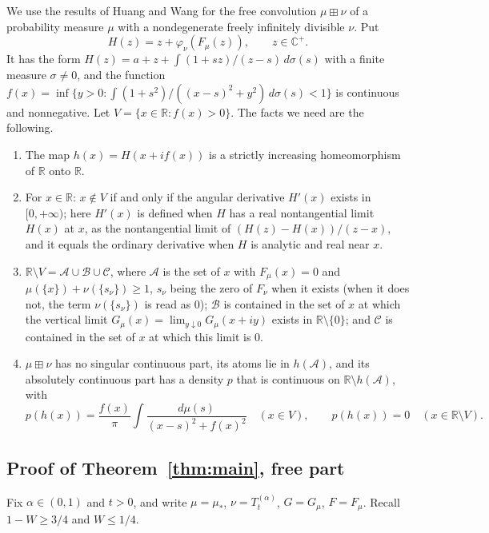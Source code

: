 \documentclass[11pt]{amsart}
\theoremstyle{definition}
\theoremstyle{remark}
\numberwithin{equation}{section}
\newcommand{\R}{\mathbb R}
\newcommand{\C}{\mathbb C}
\newcommand{\bp}{\boxplus}
\begin{document}
We use the results of Huang and Wang \cite[Section 3]{HW} for the free convolution $\mu\bp\nu$ of a probability measure $\mu$ with a nondegenerate freely infinitely divisible $\nu$. Put
\begin{equation}\label{eq:H}
H(z)=z+\varphi_\nu(F_\mu(z)),\qquad z\in\C^+ .
\end{equation}
It has the form $H(z)=a+z+\int(1+sz)/(z-s)\,d\sigma(s)$ with a finite measure $\sigma\ne0$, and the function $f(x)=\inf\{y>0:\int(1+s^2)/((x-s)^2+y^2)\,d\sigma(s)<1\}$ is continuous and nonnegative. Let $V=\{x\in\R:f(x)>0\}$. The facts we need are the following.
\begin{enumerate}[label=(HW\arabic*)]
\item\label{hw1} \cite[Proposition 3.1(5)]{HW} The map $h(x)=H(x+if(x))$ is a strictly increasing homeomorphism of $\R$ onto $\R$.
\item\label{hw2} \cite[Proposition 3.2]{HW} For $x\in\R$: $x\notin V$ if and only if the angular derivative $H'(x)$ exists in $[0,+\infty)$; here $H'(x)$ is defined when $H$ has a real nontangential limit $H(x)$ at $x$, as the nontangential limit of $(H(z)-H(x))/(z-x)$, and it equals the ordinary derivative when $H$ is analytic and real near $x$.
\item\label{hw3} \cite[Theorem 3.6, Remark 3.7]{HW} $\R\setminus V=\mathcal A\cup\mathcal B\cup\mathcal C$, where $\mathcal A$ is the set of $x$ with $F_\mu(x)=0$ and $\mu(\{x\})+\nu(\{s_\nu\})\ge1$, $s_\nu$ being the zero of $F_\nu$ when it exists (when it does not, the term $\nu(\{s_\nu\})$ is read as $0$); $\mathcal B$ is contained in the set of $x$ at which the vertical limit $G_\mu(x)=\lim_{y\downarrow0}G_\mu(x+iy)$ exists in $\R\setminus\{0\}$; and $\mathcal C$ is contained in the set of $x$ at which this limit is $0$.
\item\label{hw4} \cite[Example 3.8, Theorem 3.9]{HW} $\mu\bp\nu$ has no singular continuous part, its atoms lie in $h(\mathcal A)$, and its absolutely continuous part has a density $p$ that is continuous on $\R\setminus h(\mathcal A)$, with
\[
p(h(x))=\frac{f(x)}{\pi}\int\frac{d\mu(s)}{(x-s)^2+f(x)^2}\quad(x\in V),\qquad p(h(x))=0\quad(x\in\R\setminus V).
\]
\end{enumerate}

\subsection{Proof of Theorem~\ref{thm:main}, free part}
Fix $\alpha\in(0,1)$ and $t>0$, and write $\mu=\mu_\ast$, $\nu=T^{(\alpha)}_t$, $G=G_\mu$, $F=F_\mu$. Recall $1-W\ge3/4$ and $W\le1/4$.
\end{document}
